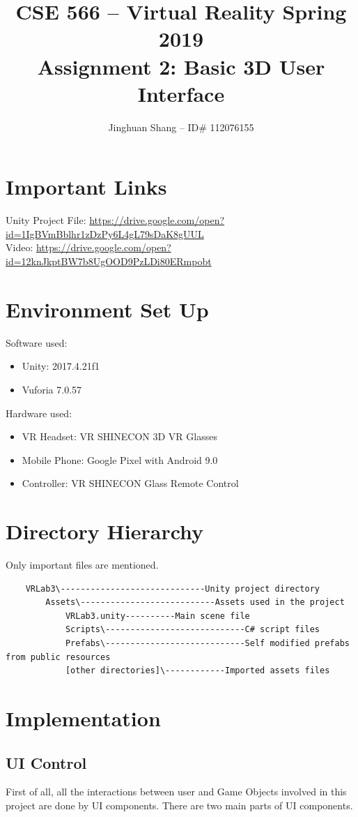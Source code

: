 \documentclass[11pt]{article}
\title{\bf CSE 566 -- 
	Virtual Reality Spring  2019 \\
	Assignment 2: Basic 3D User Interface \\
}
\author{Jinghuan Shang -- ID\# 112076155}
\begin{document}
	\maketitle
	\section{Important Links}
	Unity Project File: \url{https://drive.google.com/open?id=1IgBVmBblhr1zDzPy6L4gL79sDaK8gUUL}\\
	Video: \url{https://drive.google.com/open?id=12knJkptBW7b8UgOOD9PzLDi80ERmpobt}\\
	\section{Environment Set Up}
	Software used:
	\begin{itemize}
		\item Unity: 2017.4.21f1
		\item Vuforia 7.0.57
	\end{itemize}
	Hardware used: 
	\begin{itemize}
		\item VR Headset: VR SHINECON 3D VR Glasses
		\item Mobile Phone: Google Pixel with Android 9.0
		\item Controller: VR SHINECON Glass Remote Control
	\end{itemize}
	
	\section{Directory Hierarchy}
	Only important files are mentioned.
	\begin{lstlisting}
	VRLab3\-----------------------------Unity project directory
		Assets\---------------------------Assets used in the project
			VRLab3.unity----------Main scene file
			Scripts\----------------------------C# script files
			Prefabs\----------------------------Self modified prefabs from public resources
			[other directories]\------------Imported assets files\end{lstlisting}
	
	\section{Implementation}
	\subsection{UI Control}\label{UIC}
	First of all, all the interactions between user and Game Objects involved in this project are done by UI components. There are two main parts of UI components.
	
\end{document}
